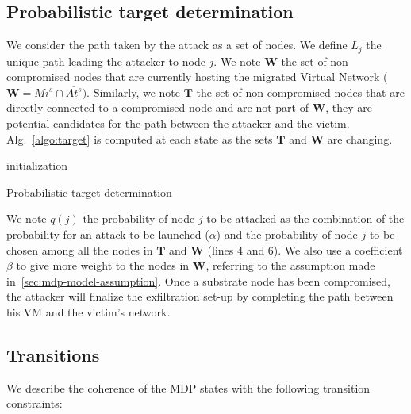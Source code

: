 \subsection{Probabilistic target determination}
\label{sec:target_proba}
We consider the path taken by the attack as a set of nodes.
We define $L_j$ the unique path leading the attacker to node $j$.
We note $\textbf{W}$ the set of non compromised nodes that are currently hosting the migrated Virtual Network (\ie $\textbf{W} = Mi^s \cap \overline{At^s})$.
Similarly, we note $\textbf{T}$ the set of non compromised nodes that are directly connected to a compromised node and are not part of $\textbf{W}$, \ie they are potential candidates for the path between the attacker and the victim. Alg.~\ref{algo:target} is computed at each state as the sets $\textbf{T}$ and $\textbf{W}$ are changing.
\begin{algorithm}
 initialization\;
 \caption{Probabilistic target determination}
 \label{algo:target}
\end{algorithm}


We note $q(j)$ the probability of node $j$ to be attacked as the combination of the probability for an attack to be launched (\ie $\alpha$) and the probability of node $j$ to be chosen among all the nodes in $\textbf{T}$ and $\textbf{W}$ (lines 4 and 6). We also use a coefficient $\beta$ to give more weight to the nodes in $\textbf{W}$, referring to the assumption made in~\ref{sec:mdp-model-assumption}.
Once a substrate node has been compromised, the attacker will finalize the exfiltration set-up by completing the path between his VM and the victim's network.


\subsection{Transitions}
We describe the coherence of the MDP states with the following transition constraints:

